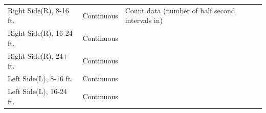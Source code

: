 \documentclass[]{article}
\begin{document}
\begin{longtable}[]{@{}lll@{}}
\begin{minipage}[t]{0.32\columnwidth}\raggedright\strut
Right Side(R), 8-16 ft.\strut
\end{minipage} & \begin{minipage}[t]{0.13\columnwidth}\raggedright\strut
Continuous\strut
\end{minipage} & \begin{minipage}[t]{0.46\columnwidth}\raggedright\strut
Count data (number of half second intervals in)\strut
\end{minipage}\tabularnewline
\begin{minipage}[t]{0.32\columnwidth}\raggedright\strut
Right Side(R), 16-24 ft.\strut
\end{minipage} & \begin{minipage}[t]{0.13\columnwidth}\raggedright\strut
Continuous\strut
\end{minipage} & \begin{minipage}[t]{0.46\columnwidth}\raggedright\strut
\strut
\end{minipage}\tabularnewline
\begin{minipage}[t]{0.32\columnwidth}\raggedright\strut
Right Side(R), 24+ ft.\strut
\end{minipage} & \begin{minipage}[t]{0.13\columnwidth}\raggedright\strut
Continuous\strut
\end{minipage} & \begin{minipage}[t]{0.46\columnwidth}\raggedright\strut
\strut
\end{minipage}\tabularnewline
\begin{minipage}[t]{0.32\columnwidth}\raggedright\strut
Left Side(L), 8-16 ft.\strut
\end{minipage} & \begin{minipage}[t]{0.13\columnwidth}\raggedright\strut
Continuous\strut
\end{minipage} & \begin{minipage}[t]{0.46\columnwidth}\raggedright\strut
\strut
\end{minipage}\tabularnewline
\begin{minipage}[t]{0.32\columnwidth}\raggedright\strut
Left Side(L), 16-24 ft.\strut
\end{minipage} & \begin{minipage}[t]{0.13\columnwidth}\raggedright\strut
Continuous\strut
\end{minipage} & \begin{minipage}[t]{0.46\columnwidth}\raggedright\strut
\strut

\end{minipage}
\end{longtable}
\end{document}
